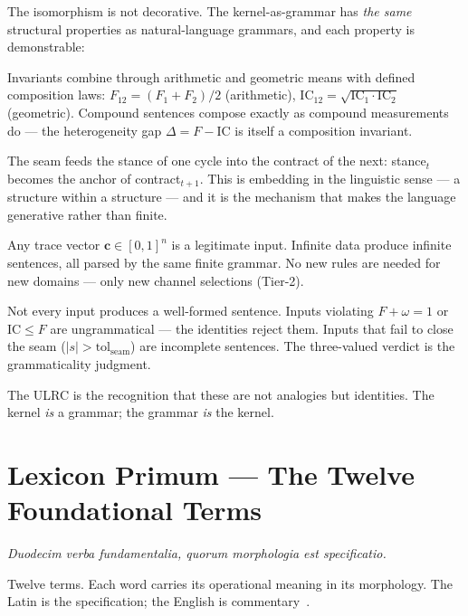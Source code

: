 \documentclass[
  aps,
  prd,
  twocolumn,
  superscriptaddress,
  nofootinbib,
  floatfix
]{revtex4-2}
\newcommand{\tolseam}{\mathrm{tol}_{\mathrm{seam}}}
\newcommand{\tvec}{\mathbf{c}}
\newcommand{\Fid}{F}
\newcommand{\Drft}{\omega}
\newcommand{\IC}{\mathrm{IC}}
\newcommand{\lat}[1]{\textit{#1}}
\begin{document}
\noindent
The isomorphism is not decorative. The kernel-as-grammar has
\emph{the same} structural properties as natural-language grammars,
and each property is demonstrable:

\begin{description}[nosep,leftmargin=0pt,labelindent=0pt]
\item[Compositionality.] Invariants combine through arithmetic
  and geometric means with defined composition laws:
  $\Fid_{12} = (\Fid_1 + \Fid_2)/2$ (arithmetic),
  $\IC_{12} = \sqrt{\IC_1 \cdot \IC_2}$ (geometric). Compound
  sentences compose exactly as compound measurements do --- the
  heterogeneity gap $\Delta = \Fid - \IC$ is itself a composition
  invariant.
\item[Recursion.] The seam feeds the stance of one cycle into the
  contract of the next: stance$_t$ becomes the anchor of
  contract$_{t+1}$. This is embedding in the linguistic sense ---
  a structure within a structure --- and it is the mechanism that
  makes the language generative rather than finite.
\item[Productivity.] Any trace vector $\tvec \in [0,1]^n$ is a
  legitimate input. Infinite data produce infinite sentences, all
  parsed by the same finite grammar. No new rules are needed for
  new domains --- only new channel selections (Tier-2).
\item[Grammaticality.] Not every input produces a well-formed
  sentence. Inputs violating $\Fid + \Drft = 1$ or $\IC \leq \Fid$
  are ungrammatical --- the identities reject them. Inputs that
  fail to close the seam ($|s| > \tolseam$) are incomplete
  sentences. The three-valued verdict is the grammaticality
  judgment.
\end{description}

\noindent
The ULRC is the recognition that these are not analogies but
identities. The kernel \emph{is} a grammar; the grammar
\emph{is} the kernel.

\section{Lexicon Primum ---
  The Twelve Foundational Terms}\label{sec:lexicon}

\lat{Duodecim verba fundamentalia, quorum morphologia est
  specificatio.}

\smallskip\noindent
Twelve terms. Each word carries its operational meaning in
its morphology. The Latin is the specification; the English
is commentary~\cite{paulus2025umcp}.
\end{document}
